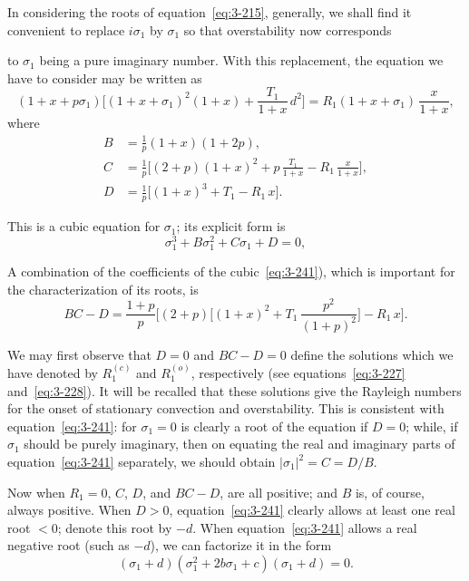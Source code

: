 In considering the roots of equation~\eqref{eq:3-215}, generally, we shall find it convenient to replace $i\sigma_1$ by $\sigma_1$ so that overstability now corresponds

\noindent to $\sigma_1$ being a pure imaginary number. With this replacement, the equation we have to consider may be written as
\begin{equation}\label{eq:3-239}
(1+x+p\sigma_1)\big[(1+x+\sigma_1)^2(1+x) + \frac{T_1}{1+x}\,d^2\big] = R_1(1+x+\sigma_1)\,\frac{x}{1+x},
\end{equation}
where
\begin{equation}\label{eq:3-240}
\begin{aligned}
B &= \frac{1}{p}(1+x)(1+2p), \\[4pt]
C &= \frac{1}{p}\big[(2+p)(1+x)^2 + p\,\frac{T_1}{1+x} - R_1\,\frac{x}{1+x}\big], \\[4pt]
D &= \frac{1}{p}\big[(1+x)^3 + T_1 - R_1\,x\big].
\end{aligned}
\end{equation}

This is a cubic equation for $\sigma_1$; its explicit form is
\begin{equation}\label{eq:3-241}
\sigma_1^3 + B\sigma_1^2 + C\sigma_1 + D = 0,
\end{equation}

A combination of the coefficients of the cubic~\eqref{eq:3-241}), which is important for the characterization of its roots, is
\begin{equation}\label{eq:3-242}
BC - D = \frac{1+p}{p}\bigg[(2+p)\bigg[(1+x)^2 + T_1\,\frac{p^2}{(1+p)^2}\bigg] - R_1\,x\bigg].
\end{equation}

We may first observe that $D = 0$ and $BC - D = 0$ define the solutions which we have denoted by $R_1^{(c)}$ and $R_1^{(o)}$, respectively (see equations~\eqref{eq:3-227} and~\eqref{eq:3-228}). It will be recalled that these solutions give the Rayleigh numbers for the onset of stationary convection and overstability. This is consistent with equation~\eqref{eq:3-241}: for $\sigma_1 = 0$ is clearly a root of the equation if $D = 0$; while, if $\sigma_1$ should be purely imaginary, then on equating the real and imaginary parts of equation~\eqref{eq:3-241} separately, we should obtain $|\sigma_1|^2 = C = D/B$.

Now when $R_1 = 0$, $C$, $D$, and $BC - D$, are all positive; and $B$ is, of course, always positive. When $D > 0$, equation~\eqref{eq:3-241} clearly allows at least one real root $< 0$; denote this root by $-d$. When equation~\eqref{eq:3-241} allows a real negative root (such as $-d$), we can factorize it in the form
\begin{equation}\label{eq:3-243}
(\sigma_1 + d)(\sigma_1^2 + 2b\sigma_1 + c)(\sigma_1 + d) = 0.
\end{equation}

